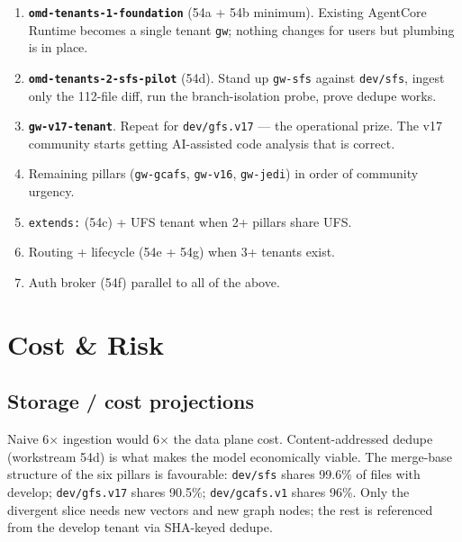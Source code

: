 \documentclass[11pt,letterpaper]{article}
\begin{document}
\begin{enumerate}[leftmargin=*]
    \item \textbf{\texttt{omd-tenants-1-foundation}} (54a + 54b
    minimum). Existing AgentCore Runtime becomes a single tenant
    \texttt{gw}; nothing changes for users but plumbing is in place.
    \item \textbf{\texttt{omd-tenants-2-sfs-pilot}} (54d). Stand up
    \texttt{gw-sfs} against \texttt{dev/sfs}, ingest only the 112-file
    diff, run the branch-isolation probe, prove dedupe works.
    \item \textbf{\texttt{gw-v17-tenant}}. Repeat for \texttt{dev/gfs.v17}
    --- the operational prize. The v17 community starts getting
    AI-assisted code analysis that is correct.
    \item Remaining pillars (\texttt{gw-gcafs}, \texttt{gw-v16},
    \texttt{gw-jedi}) in order of community urgency.
    \item \texttt{extends:} (54c) + UFS tenant when 2+ pillars share UFS.
    \item Routing + lifecycle (54e + 54g) when 3+ tenants exist.
    \item Auth broker (54f) parallel to all of the above.
\end{enumerate}

\section{Cost \& Risk}

\subsection{Storage / cost projections}

Naive 6$\times$ ingestion would 6$\times$ the data plane cost.
Content-addressed dedupe (workstream 54d) is what makes the model
economically viable. The merge-base structure of the six pillars is
favourable: \texttt{dev/sfs} shares 99.6\% of files with develop;
\texttt{dev/gfs.v17} shares 90.5\%; \texttt{dev/gcafs.v1} shares 96\%.
Only the divergent slice needs new vectors and new graph nodes; the
rest is referenced from the develop tenant via SHA-keyed dedupe.
\end{document}
